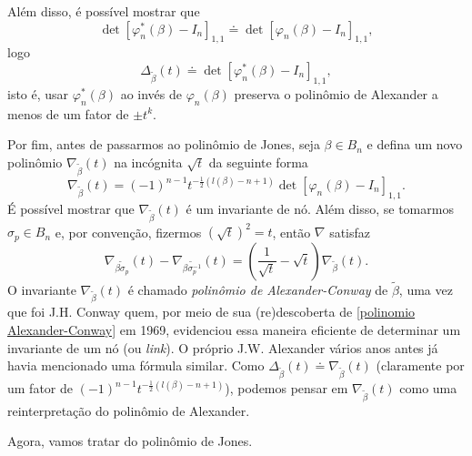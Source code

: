 	\par\vspace{0.3cm} Além disso, é possível mostrar que
	\begin{equation*}
	    \det[\varphi_n^\ast(\beta) - I_n]_{1,1}\doteq\det[\varphi_n(\beta) - I_n]_{1,1},
	\end{equation*}	
	logo
	\begin{equation*}
	    \Delta_{\widetilde{\beta}}(t) \doteq \det[\varphi_n^\ast(\beta) - I_n]_{1,1},
	\end{equation*}
	isto é, usar $\varphi_n^\ast(\beta)$ ao invés de $\varphi_n(\beta)$ preserva o polinômio 
	de Alexander a menos de um fator de $\pm t^k$.
	
	\par\vspace{0.3cm} Por fim, antes de passarmos ao polinômio de Jones, seja $\beta\in B_n$ 
	e defina um novo polinômio $\nabla_{\widetilde{\beta}}(t)$ na incógnita $\sqrt{t}$ da seguinte forma
	\begin{equation*}
	    \nabla_{\widetilde{\beta}}(t)
	    = (-1)^{n-1}t^{-\frac{1}{2}(l(\beta)-n+1)}\det[\varphi_n(\beta) - I_n]_{1,1}.
	\end{equation*}
	É possível mostrar que $\nabla_{\widetilde{\beta}}(t)$ é um invariante de nó. 
	Além disso, se tomarmos $\sigma_p\in B_n$ e, por convenção, fizermos $(\sqrt{t})^2 = t$, 
	então $\nabla$ satisfaz
	\begin{equation}
	\label{polinomio Alexander-Conway}
    	\nabla_{\widetilde{\beta\sigma_p}}(t) - \nabla_{\widetilde{\beta\sigma_p^{-1}}}(t) 
    	= \left(\frac{1}{\sqrt{t}}- \sqrt{t}\right)\nabla_{\widetilde{\beta}}(t).
	\end{equation}
	O invariante $\nabla_{\widetilde{\beta}}(t)$ é chamado \textit{polinômio de Alexander-Conway} 
	de $\widetilde{\beta}$, uma vez que foi J.H. Conway quem, por meio de sua (re)descoberta de 
	\eqref{polinomio Alexander-Conway} em 1969, evidenciou essa maneira eficiente de determinar 
	um invariante de um nó (ou \textit{link}). O próprio J.W. Alexander vários anos antes já 
	havia mencionado uma fórmula similar. Como 
	$\Delta_{\widetilde{\beta}}(t)\doteq\nabla_{\widetilde{\beta}}(t)$ (claramente por um 
	fator de $(-1)^{n-1}t^{-\frac{1}{2}(l(\beta)-n+1)}$), podemos pensar em 
	$\nabla_{\widetilde{\beta}}(t)$ como uma reinterpretação do polinômio de Alexander.
	
	\par\vspace{0.3cm} Agora, vamos tratar do polinômio de Jones.
	
